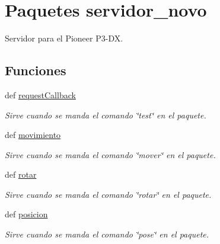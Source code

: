 \hypertarget{namespaceservidor__novo}{
\section{Paquetes servidor\_\-novo}
\label{namespaceservidor__novo}
}


Servidor para el Pioneer P3-\/DX.  


\subsection*{Funciones}
\begin{DoxyCompactItemize}
\item 
def \hyperlink{namespaceservidor__novo_a994b4e4dc22448a609ecd86baa9ff6da}{requestCallback}
\begin{DoxyCompactList}\small\item\em Sirve cuando se manda el comando \char`\"{}test\char`\"{} en el paquete. \end{DoxyCompactList}\item 
def \hyperlink{namespaceservidor__novo_ae02aab4783a9544975ff25e7d2fde80a}{movimiento}
\begin{DoxyCompactList}\small\item\em Sirve cuando se manda el comando \char`\"{}mover\char`\"{} en el paquete. \end{DoxyCompactList}\item 
def \hyperlink{namespaceservidor__novo_a8af363dfe669e9277832c4491d253db3}{rotar}
\begin{DoxyCompactList}\small\item\em Sirve cuando se manda el comando \char`\"{}rotar\char`\"{} en el paquete. \end{DoxyCompactList}\item 
def \hyperlink{namespaceservidor__novo_a6bb7f16cf80ec7b45c715da84a62257d}{posicion}
\begin{DoxyCompactList}\small\item\em Sirve cuando se manda el comando \char`\"{}pose\char`\"{} en el paquete. \end{DoxyCompactList}\end{DoxyCompactItemize}
